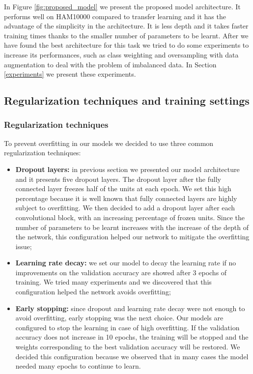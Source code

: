 		In Figure \ref{fig:proposed_model} we present the proposed model architecture. It performs well on HAM10000 compared to transfer learning and it has the advantage of the simplicity in the architecture. It is less depth and it takes faster training times thanks to the smaller number of parameters to be learnt. 
		After we have found the best architecture for this task we tried to do some experiments to increase its performances, such as class weighting and oversampling with data augmentation to deal with the problem of imbalanced data. In Section \ref{experiments} we present these experiments.
	
	\subsection{Regularization techniques and training settings}
	
		\subsubsection{Regularization techniques} \label{regularization_techniques}
		
			To prevent overfitting in our models we decided to use three common regularization techniques:
			
			\begin{itemize}
				\item \textbf{Dropout layers:} in previous section we presented our model architecture and it presents five dropout layers. The dropout layer after the fully connected layer freezes half of the units at each epoch. We set this high percentage because it is well known that fully connected layers are highly subject to overfitting. We then decided to add a dropout layer after each convolutional block, with an increasing percentage of frozen units. Since the number of parameters to be learnt increases with the increase of the depth of the network, this configuration helped our network to mitigate the overfitting issue;
				\item \textbf{Learning rate decay:} we set our model to decay the learning rate if no improvements on the validation accuracy are showed after 3 epochs of training. We tried many experiments and we discovered that this configuration helped the network avoids overfitting;
				\item \textbf{Early stopping:} since dropout and learning rate decay were not enough to avoid overfitting, early stopping was the next choice. Our models are configured to stop the learning in case of high overfitting. If the validation accuracy does not increase in 10 epochs, the training will be stopped and the weights corresponding to the best validation accuracy will be restored. We decided this configuration because we observed that in many cases the model needed many epochs to continue to learn.
			\end{itemize}
		

